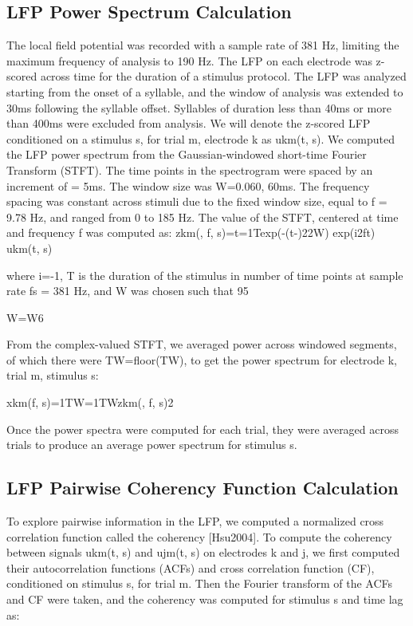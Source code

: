 \subsection{LFP Power Spectrum Calculation}
    
    The local field potential was recorded with a sample rate of 381 Hz, limiting the maximum frequency of analysis to 190 Hz. The LFP on each electrode was z-scored across time for the duration of a stimulus protocol. The LFP was analyzed starting from the onset of a syllable, and the window of analysis was extended to 30ms following the syllable offset. Syllables of duration less than 40ms or more than 400ms were excluded from analysis.
    We will denote the z-scored LFP conditioned on a stimulus s, for trial m, electrode k as ukm(t, s). We computed the LFP power spectrum from the Gaussian-windowed short-time Fourier Transform (STFT). The time points in the spectrogram were spaced by an increment of  = 5ms. The window size was W=0.060, 60ms. The frequency spacing was constant across stimuli due to the fixed window size, equal to f = 9.78 Hz, and ranged from 0 to 185 Hz. The value of the STFT, centered at time  and frequency f was computed as:
zkm(, f, s)=t=1Texp(-(t-)22W) exp(i2ft) ukm(t, s)

where i=-1, T is the duration of the stimulus in number of time points at sample rate fs = 381 Hz, and W was chosen such that 95%

W=W6

From the complex-valued STFT, we averaged power across  windowed segments, of which there were TW=floor(TW), to get the power spectrum for electrode k, trial m, stimulus s:

xkm(f, s)=1TW=1TWzkm(, f, s)2

Once the power spectra were computed for each trial, they were averaged across trials to produce an average power spectrum for stimulus s.


\subsection{LFP Pairwise Coherency Function Calculation}

    To explore pairwise information in the LFP, we computed a normalized cross correlation function called the coherency [Hsu2004]. To compute the coherency between signals ukm(t, s) and ujm(t, s)  on electrodes k and j, we first computed their autocorrelation functions (ACFs) and cross correlation function (CF), conditioned on stimulus s, for trial m. Then the Fourier transform of the ACFs and CF were taken, and the coherency was computed for stimulus s and time lag  as:

